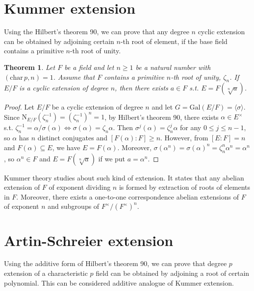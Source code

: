 \documentclass{article}
\newtheorem{theorem}{Theorem}
\newcommand{\Gal}{\mathrm{Gal}}
\newcommand{\Nm}{\mathrm{N}}
\newcommand{\cha}{\mathrm{char}\,}
\begin{document}
\section{Kummer extension}
Using the Hilbert's theorem 90, we can prove that any degree $n$ cyclic extension can be obtained by adjoining certain $n$-th root of element, if the base field contains a primitive $n$-th root of unity. 
\begin{theorem}
Let $F$ be a field and let $n\geq 1$ be a natural number with $(\cha p, n) = 1$. Assume that $F$ contains a primitive $n$-th root of unity, $\zeta_{n}$. If $E/F$ is a cyclic extension of degree $n$, then there exists $a\in F$ s.t. $E = F(\sqrt[n]{a})$. 
\end{theorem}
\begin{proof}
Let $E/F$ be a cyclic extension of degree $n$ and let $G = \Gal(E/F) = \langle \sigma\rangle$. 
Since $\Nm_{E/F}(\zeta_{n}^{-1}) = (\zeta_{n}^{-1})^{n} = 1$, by Hilbert's theorem 90, there exists $\alpha\in E^{\times}$ s.t. $\zeta_{n}^{-1} = \alpha/\sigma(\alpha)\Leftrightarrow \sigma(\alpha) = \zeta_{n}\alpha$. 
Then $\sigma^{j}(\alpha) = \zeta_{n}^{j}\alpha$ for any $0\leq j\leq n-1$, so $\alpha$ has $n$ distinct conjugates and $[F(\alpha):F]\geq n$. 
However, from $[E:F] = n$ and $F(\alpha)\subseteq E$, we have $E = F(\alpha)$. 
Moreover, $\sigma(\alpha^{n}) = \sigma(\alpha)^{n}= \zeta_{n}^{n}\alpha^{n} = \alpha^{n}$, so $\alpha^{n}\in F$ and $E = F(\sqrt[n]{a})$ if we put $a = \alpha^{n}$. 
\end{proof}

Kummer theory studies about such kind of extension. It states that any abelian extension of $F$ of exponent dividing $n$ is formed by extraction of roots of elements in $F$. Moreover, there exists a one-to-one correspondence  abelian extensions of $F$ of exponent $n$ and subgroups of $F^{\times}/(F^{\times})^{n}$. 

\section{Artin-Schreier extension}
Using the additive form of Hilbert's theorem 90, we can prove that degree $p$ extension of a characteristic $p$ field can be obtained by adjoining a root of certain  polynomial. This can be considered  additive analogue of Kummer extension. 
\end{document}
